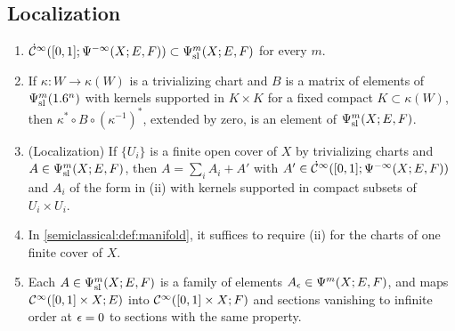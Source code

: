 \subsection{Localization}
\begin{lemma}\label{semiclassical:lem:structure}
  \begin{enumerate}[label=\textup{(\roman*)}]
  \item $\dot{\mathcal{C}}^\infty([0,1];\Psi^{-\infty}(X;E,F))\subset\Psi^{m}_{\mathrm{sl}}(X;E,F)$ for every $m$.
  \item If $\kappa:W\to\kappa(W)$ is a trivializing chart and $B$ is a matrix of
    elements of $\Psi^{m}_{\mathrm{sl}}(1.6^n)$ with kernels supported in $K\times K$ for a fixed
    compact $K\subset\kappa(W)$, then $\kappa^*\circ B\circ(\kappa^{-1})^*$, extended by
    zero, is an element of $\Psi^{m}_{\mathrm{sl}}(X;E,F)$.
  \item \textup{(Localization)} If $\{U_i\}$ is a finite open cover of $X$ by
    trivializing charts and $A\in\Psi^{m}_{\mathrm{sl}}(X;E,F)$, then $A=\sum_iA_i+A'$ with
    $A'\in\dot{\mathcal{C}}^\infty([0,1];\Psi^{-\infty}(X;E,F))$ and $A_i$ of the form in
    \textup{(ii)} with kernels supported in compact subsets of $U_i\times U_i$.
  \item In \cref{semiclassical:def:manifold}, it suffices to require (ii) for the
    charts of one finite cover of $X$.
  \item Each $A\in\Psi^{m}_{\mathrm{sl}}(X;E,F)$ is a family of elements $A_\epsilon\in\Psi^{m}(X;E,F)$,
    and maps $\mathcal{C}^\infty([0,1]\times X;E)$ into $\mathcal{C}^\infty([0,1]\times X;F)$ and sections vanishing
    to infinite order at $\epsilon=0$ to sections with the same property.
  \end{enumerate}
\end{lemma}
